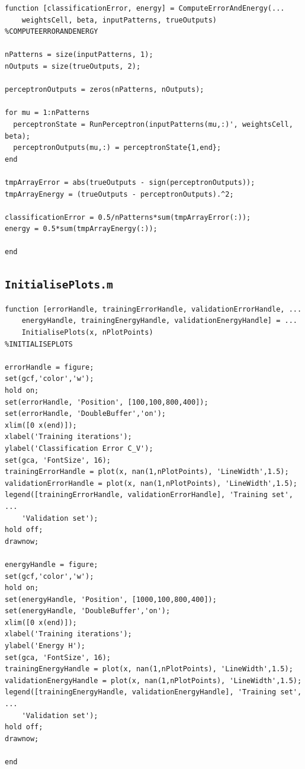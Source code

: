 \documentclass[12pt,titlepage]{article}
\begin{document}
\begin{lstlisting}
function [classificationError, energy] = ComputeErrorAndEnergy(...
    weightsCell, beta, inputPatterns, trueOutputs)
%COMPUTEERRORANDENERGY

nPatterns = size(inputPatterns, 1);
nOutputs = size(trueOutputs, 2);

perceptronOutputs = zeros(nPatterns, nOutputs);

for mu = 1:nPatterns
  perceptronState = RunPerceptron(inputPatterns(mu,:)', weightsCell, beta);
  perceptronOutputs(mu,:) = perceptronState{1,end};
end

tmpArrayError = abs(trueOutputs - sign(perceptronOutputs));
tmpArrayEnergy = (trueOutputs - perceptronOutputs).^2;
  
classificationError = 0.5/nPatterns*sum(tmpArrayError(:));
energy = 0.5*sum(tmpArrayEnergy(:));

end
\end{lstlisting}

\subsection*{\texttt{InitialisePlots.m}}

\begin{lstlisting}
function [errorHandle, trainingErrorHandle, validationErrorHandle, ...
    energyHandle, trainingEnergyHandle, validationEnergyHandle] = ...
    InitialisePlots(x, nPlotPoints)
%INITIALISEPLOTS

errorHandle = figure;
set(gcf,'color','w');
hold on;
set(errorHandle, 'Position', [100,100,800,400]);
set(errorHandle, 'DoubleBuffer','on');
xlim([0 x(end)]);
xlabel('Training iterations');
ylabel('Classification Error C_V');
set(gca, 'FontSize', 16);
trainingErrorHandle = plot(x, nan(1,nPlotPoints), 'LineWidth',1.5);
validationErrorHandle = plot(x, nan(1,nPlotPoints), 'LineWidth',1.5);
legend([trainingErrorHandle, validationErrorHandle], 'Training set', ...
    'Validation set');
hold off;
drawnow;

energyHandle = figure;
set(gcf,'color','w');
hold on;
set(energyHandle, 'Position', [1000,100,800,400]);
set(energyHandle, 'DoubleBuffer','on');
xlim([0 x(end)]);
xlabel('Training iterations');
ylabel('Energy H');
set(gca, 'FontSize', 16);
trainingEnergyHandle = plot(x, nan(1,nPlotPoints), 'LineWidth',1.5);
validationEnergyHandle = plot(x, nan(1,nPlotPoints), 'LineWidth',1.5);
legend([trainingEnergyHandle, validationEnergyHandle], 'Training set', ...
    'Validation set');
hold off;
drawnow;

end
\end{lstlisting}
\end{document}
